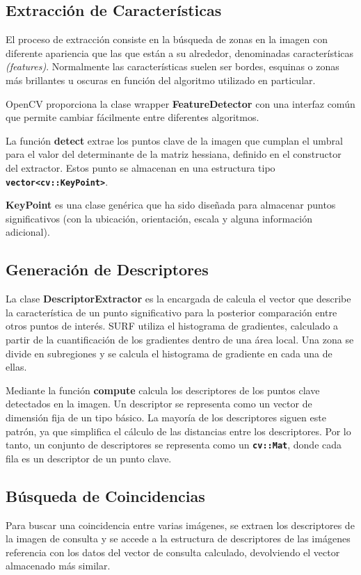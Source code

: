 \subsection{Extracción de Características}

El proceso de extracción consiste en la búsqueda de zonas en la imagen
con diferente apariencia que las que están a su alrededor, denominadas características \textit{(features)}. Normalmente las características suelen ser bordes, esquinas o zonas más brillantes u oscuras en
función del algoritmo utilizado en particular.

OpenCV proporciona la clase wrapper \textbf{FeatureDetector} con una interfaz común que permite
cambiar fácilmente entre diferentes algoritmos.


La función \textbf{detect} extrae los puntos clave de la imagen que
cumplan el umbral para el valor del determinante de la matriz
hessiana, definido en el constructor del extractor. Estos punto se
almacenan en una estructura tipo \textbf{\texttt{vector<cv::KeyPoint>}}.

\textbf{KeyPoint} es una clase genérica que ha sido diseñada para
almacenar puntos significativos (con la ubicación, orientación, escala
y alguna información adicional).

\subsection{Generación de Descriptores}
La clase \textbf{DescriptorExtractor} es la encargada de calcula
el vector que describe la característica de un punto significativo
para la posterior comparación entre otros puntos de interés. SURF
utiliza el histograma de gradientes, calculado a partir de la
cuantificación de los gradientes dentro de una área local. Una zona se divide
en subregiones y se calcula el histograma de gradiente en cada una de
ellas.

Mediante la función \textbf{compute} calcula los descriptores de los
puntos clave detectados en la imagen. Un descriptor se representa como
un vector de dimensión fija de un tipo básico. La mayoría de los
descriptores siguen este patrón, ya que simplifica el cálculo de las
distancias entre los descriptores. Por lo tanto, un conjunto de
descriptores se representa como un \textbf{\texttt{cv::Mat}}, donde cada fila
es un descriptor de un punto clave.

\subsection{Búsqueda de Coincidencias}
Para buscar una coincidencia entre varias imágenes, se extraen los
descriptores de la imagen de consulta y se accede a la estructura de
descriptores de las imágenes referencia con los
datos del vector de consulta calculado, devolviendo el vector almacenado más
similar.

